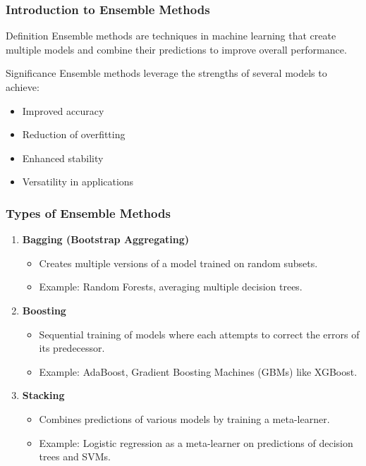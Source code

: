 \documentclass[aspectratio=169]{beamer}
\begin{document}
\frame{\titlepage}

\begin{frame}[fragile]
    \frametitle{Introduction to Ensemble Methods}
    
    \begin{block}{Definition}
        Ensemble methods are techniques in machine learning that create multiple models and combine their predictions to improve overall performance. 
    \end{block}
    
    \begin{block}{Significance}
        Ensemble methods leverage the strengths of several models to achieve:
        \begin{itemize}
            \item Improved accuracy
            \item Reduction of overfitting
            \item Enhanced stability
            \item Versatility in applications
        \end{itemize}
    \end{block}
    
\end{frame}

\begin{frame}[fragile]
    \frametitle{Types of Ensemble Methods}
    
    \begin{enumerate}
        \item \textbf{Bagging (Bootstrap Aggregating)} 
            \begin{itemize}
                \item Creates multiple versions of a model trained on random subsets.
                \item Example: Random Forests, averaging multiple decision trees.
            \end{itemize}
        \item \textbf{Boosting} 
            \begin{itemize}
                \item Sequential training of models where each attempts to correct the errors of its predecessor.
                \item Example: AdaBoost, Gradient Boosting Machines (GBMs) like XGBoost.
            \end{itemize}
        \item \textbf{Stacking} 
            \begin{itemize}
                \item Combines predictions of various models by training a meta-learner.
                \item Example: Logistic regression as a meta-learner on predictions of decision trees and SVMs.
            \end{itemize}
    \end{enumerate}

\end{frame}
\end{document}
